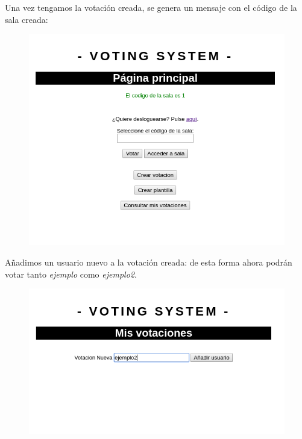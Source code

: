 \documentclass{article}
\begin{document}
 	Una vez tengamos la votación creada, se genera un mensaje con el código de la sala creada:
 	\begin{figure}[H]
 		\centering
 		\includegraphics[totalheight=7.5cm]{img/cap11}
 		\caption{}
 	\end{figure}
 
 	Añadimos un usuario nuevo a la votación creada: de esta forma ahora podrán votar tanto \textit{ejemplo} como \textit{ejemplo2}.	
 	\begin{figure}[H]
 		\centering
 		\includegraphics[totalheight=5.6cm]{img/cap19}
 		\caption{}
 	\end{figure}
 
\end{document}
